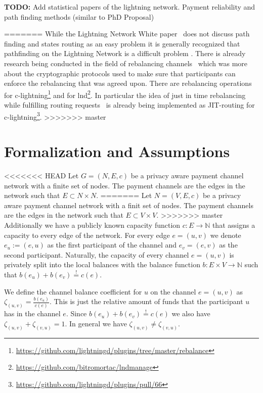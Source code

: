\documentclass[a4paper]{paper}
\begin{document}
\textbf{TODO:} Add statistical papers of the lightning network. Payment reliability and path finding methods (similar to PhD Proposal)

=======
While the Lightning Network White paper~\cite{poon2016bitcoin} does not discuss path finding and states routing as an easy problem it is generally recognized that pathfinding on the Lightning Network is a difficult problem \cite{piatkivskyi2018split, prihodko2016flare, bagaria2019boomerang, pickhardt2019pathfinding, grunspan2018ant, sivaraman2018routing}.
There is already research being conducted in the field of rebalancing channels~\cite{khalil2017revive} which was more about the cryptographic protocols used to make sure that participants can enforce the rebalancing that was agreed upon.
There are rebalancing operations for c-lightning\footnote{\url{https://github.com/lightningd/plugins/tree/master/rebalance}} and for lnd\footnote{\url{https://github.com/bitromortac/lndmanage}}.
In particular the idea of just in time rebalancing while fulfilling routing requests~\cite{pickhardt2019jit} is already being implemented as JIT-routing for c-lightning\footnote{\url{https://github.com/lightningd/plugins/pull/66}}. 
>>>>>>> master

\section{Formalization and Assumptions}
\label{sec:formalization}

<<<<<<< HEAD
Let $G=(N,E,c)$ be a privacy aware payment channel network with a finite set of nodes.
The payment channels are the edges in the network such that $E\subset N\times N$.
=======
Let $N=(V,E,c)$ be a privacy aware payment channel network with a finit set of nodes.
The payment channels are the edges in the network such that $E\subset V\times V$.
>>>>>>> master
Additionally we have a publicly known capacity function $c: E\longrightarrow \mathbb{N}$ that assigns a capacity to every edge of the network.
For every edge $e=(u,v)$ we denote $e_u:=(e,u)$ as the first participant of the channel and $e_v=(e,v)$ as the second participant.
Naturally, the capacity of every channel $e=(u,v)$ is privately split into the local balances with the balance function $b: E\times V\longrightarrow\mathbb{N}$ such that $b(e_u)+b(e_v)\stackrel{!}{=}c(e)$.

We define the channel balance coefficient for $u$ on the channel $e=(u,v)$ as  $\zeta_{(u,v)} = \frac{b(e_u)}{c(e)}$.
This is just the relative amount of funds that the participant $u$ has in the channel $e$.
Since $b(e_u)+b(e_v)\stackrel{!}{=}c(e)$ we also have $\zeta_{(u,v)} + \zeta_{(v,u)}=1$.
In general we have $\zeta_{(u,v)} \neq \zeta_{(v,u)}$.
\end{document}
